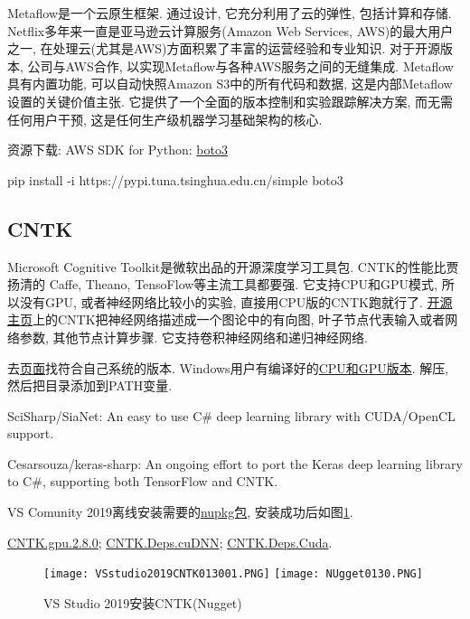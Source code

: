 Metaflow是一个云原生框架. 通过设计, 它充分利用了云的弹性, 包括计算和存储.
Netflix多年来一直是亚马逊云计算服务(Amazon Web Services, AWS)的最大用户之一, 在处理云(尤其是AWS)方面积累了丰富的运营经验和专业知识. 对于开源版本, 公司与AWS合作, 以实现Metaflow与各种AWS服务之间的无缝集成.
Metaflow具有内置功能, 可以自动快照Amazon S3中的所有代码和数据, 这是内部Metaflow设置的关键价值主张. 它提供了一个全面的版本控制和实验跟踪解决方案, 而无需任何用户干预, 这是任何生产级机器学习基础架构的核心.

\begin{remark}
资源下载: AWS SDK for Python: \href{https://github.com/boto/boto3}{boto3}

pip install -i https://pypi.tuna.tsinghua.edu.cn/simple boto3
\end{remark}
\subsection{CNTK}
Microsoft Cognitive Toolkit是微软出品的开源深度学习工具包.
CNTK的性能比贾扬清的 Caffe, Theano, TensoFlow等主流工具都要强. 它支持CPU和GPU模式, 所以没有GPU, 或者神经网络比较小的实验, 直接用CPU版的CNTK跑就行了. \href{https://github.com/Microsoft/CNTK}{开源主页}上的CNTK把神经网络描述成一个图论中的有向图, 叶子节点代表输入或者网络参数, 其他节点计算步骤. 它支持卷积神经网络和递归神经网络. 

去\href{https://github.com/Microsoft/CNTK/wiki/CNTK-Binary-Download-and-Configuration}{页面}找符合自己系统的版本.
Windows用户有编译好的\href{https://cntk.ai/nightly-windows.html}{CPU和GPU版本}. 解压, 然后把目录添加到PATH变量.

SciSharp/SiaNet: An easy to use C\# deep learning library with CUDA/OpenCL support.

Cesarsouza/keras-sharp: An ongoing effort to port the Keras deep learning library to C\#, supporting both TensorFlow and CNTK.

VS Comunity 2019离线安装需要的\href{https://www.nuget.org/packages?q=CNTK.GPU}{nupkg包}, 安装成功后如图\ref{VSstudio2019CNTK013001}.

\href{https://globalcdn.nuget.org/packages/cntk.gpu.2.8.0-rc0.dev20200126.nupkg}{CNTK.gpu.2.8.0};
\href{https://www.nuget.org/api/v2/package/CNTK.Deps.cuDNN/2.8.0-rc0.dev20200127}{CNTK.Deps.cuDNN};
\href{https://www.nuget.org/packages/CNTK.Deps.Cuda/}{CNTK.Deps.Cuda}.

\begin{figure}[H]
\centering
\texttt{[image: VSstudio2019CNTK013001.PNG]}
\texttt{[image: NUgget0130.PNG]}
\caption{VS Studio 2019安装CNTK(Nugget)}
\label{VSstudio2019CNTK013001}
\end{figure}

